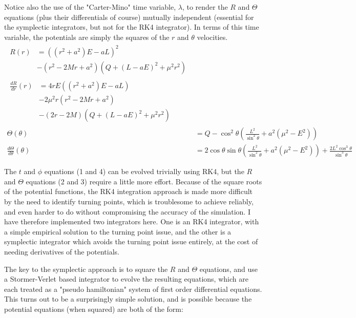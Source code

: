 \documentclass[11pt]{article}
\begin{document}
Notice also the use of the "Carter-Mino" time variable, $\lambda$, to render the $R$ and $\Theta$ equations (plus their differentials of course) mutually independent (essential for the symplectic integrators, but not for the RK4 integrator).
In terms of this time variable, the potentials are simply the squares of the $r$ and $\theta$ velocities.
\begin{align}
   \begin{split}
    R(r) &= \left((r^2 + a^2) E - aL \right)^2 \label{eq:1}\\
    &- (r^2 - 2Mr  + a^2) \left(Q + ( L - aE)^2 + \mu^2 r^2 \right)
   \end{split}\\
   \begin{split}
    \frac{d R}{d r} (r) &= 4rE \left((r^2 + a^2)E - aL \right) \label{eq:2}\\
    &- 2\mu^2r(r^2 - 2Mr  + a^2)\\
    &- (2r - 2M) \left(Q + ( L - aE)^2 + \mu^2 r^2 \right)
   \end{split}\\
  \Theta (\theta) &= Q - {\cos^2 \theta } \left( \frac{L^2}{\sin^2 \theta } + a^2( \mu^2 - E^2) \right) \label{eq:3}\\
  \frac{d \Theta}{d \theta} (\theta) &= 2 \cos \theta \sin \theta \left(\frac{L^2} {\sin^2 \theta } + a^2(\mu^2 - E^2) \right) +\frac{2 L^2 \cos^3 \theta } {\sin^3 \theta } \label{eq:4}
\end{align}

The $t$ and $\phi$ equations (1 and 4) can be evolved trivially using RK4, but the $R$ and $\Theta$ equations (2 and 3) require a little more effort.
Because of the square roots of the potential functions, the RK4 integration approach is made more difficult by the need to identify turning points, which is troublesome to achieve reliably, and even harder to do without compromising the accuracy of the simulation.
I have therefore implemented two integrators here.
One is an RK4 integrator, with a simple empirical solution to the turning point issue, and the other is a symplectic integrator which avoids the turning point issue entirely, at the cost of needing derivatives of the potentials.

The key to the symplectic approach is to square the $R$ and $\Theta$ equations, and use a Stormer-Verlet based integrator \cite{hairer} to evolve the resulting equations, which are each treated as a "pseudo hamiltonian" system of first order differential equations.  This turns out to be a surprisingly simple solution, and is possible because the potential equations (when squared) are both of the form:
\end{document}
